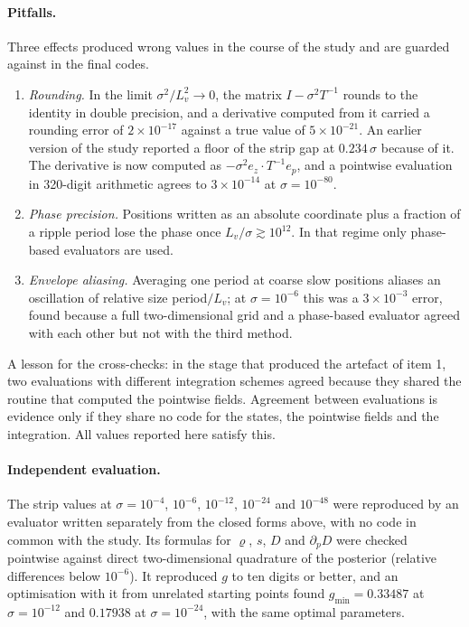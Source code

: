 \paragraph*{Pitfalls.} Three effects produced wrong values in the course of the study and are guarded against in the final codes.
\begin{enumerate}
\item \emph{Rounding.} In the limit $\sigma^2/L_v^2 \to 0$, the matrix $I - \sigma^2 T^{-1}$ rounds to the identity in double precision, and a derivative computed from it carried a rounding error of $2\times 10^{-17}$ against a true value of $5\times 10^{-21}$. An earlier version of the study reported a floor of the strip gap at $0.234\,\sigma$ because of it. The derivative is now computed as $-\sigma^2 e_z\cdot T^{-1}e_p$, and a pointwise evaluation in 320-digit arithmetic agrees to $3\times 10^{-14}$ at $\sigma = 10^{-80}$.
\item \emph{Phase precision.} Positions written as an absolute coordinate plus a fraction of a ripple period lose the phase once $L_v/\sigma \gtrsim 10^{12}$. In that regime only phase-based evaluators are used.
\item \emph{Envelope aliasing.} Averaging one period at coarse slow positions aliases an oscillation of relative size period$/L_v$; at $\sigma = 10^{-6}$ this was a $3\times 10^{-3}$ error, found because a full two-dimensional grid and a phase-based evaluator agreed with each other but not with the third method.
\end{enumerate}
A lesson for the cross-checks: in the stage that produced the artefact of item 1, two evaluations with different integration schemes agreed because they shared the routine that computed the pointwise fields. Agreement between evaluations is evidence only if they share no code for the states, the pointwise fields and the integration. All values reported here satisfy this.

\paragraph*{Independent evaluation.} The strip values at $\sigma = 10^{-4}$, $10^{-6}$, $10^{-12}$, $10^{-24}$ and $10^{-48}$ were reproduced by an evaluator written separately from the closed forms above, with no code in common with the study. Its formulas for $\varrho$, $s$, $D$ and $\partial_p D$ were checked pointwise against direct two-dimensional quadrature of the posterior (relative differences below $10^{-6}$). It reproduced $g$ to ten digits or better, and an optimisation with it from unrelated starting points found $g_{\min} = 0.33487$ at $\sigma = 10^{-12}$ and $0.17938$ at $\sigma = 10^{-24}$, with the same optimal parameters.

